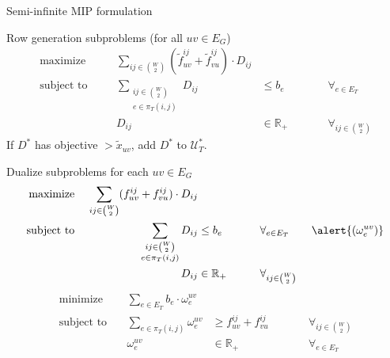 \documentclass[aspectratio=149]{beamer}
\begin{document}
\begin{frame}{Semi-infinite MIP formulation}
{\begin{textblock}{1}
\begin{alertblock}{Row generation subproblems (for all $uv \in E_G$)}
                    \vspace*{-1em}
                    \begin{alignat*}{5}
                        \text{maximize}\quad && \sum_{ij \in \binom{W}{2}} (\tilde f_{uv}^{ij} + \tilde f_{vu}^{ij}) \cdot D_{ij} &&& \\
                        \text{subject to}\quad && \sum_{\substack{ij \in \binom{W}{2}\\e \in \pi_T(i,j)}} D_{ij} &\le b_e &&\qquad \forall_{e \in E_T} \\
                        && D_{ij} &\in \mathbb{R}_+ &&\qquad \forall_{ij \in \binom{W}{2}}
                    \end{alignat*}
                    If $D^*$ has objective $> \tilde x_{uv}$, add $D^*$ to $\mathcal U_T^*$.
                \end{alertblock}
            \end{textblock}%
        }%
    \end{frame}

    \begin{frame}{Dualize subproblems for each $uv \in E_G$}
        \vspace*{-1em}
        \begin{alignat*}{5}
            \text{maximize}\ && \sum_{ij \in \binom{W}{2}} (f_{uv}^{ij} + f_{vu}^{ij}) \cdot D_{ij} &&& \\
            \text{subject to}\ && \sum_{\substack{ij \in \binom{W}{2}\\e \in \pi_T(i,j)}} D_{ij} &\le b_e &&\qquad \forall_{e \in E_T} \qquad \alert{(\omega_e^{uv})} \\
            && D_{ij} &\in \mathbb{R}_+ &&\qquad \forall_{ij \in \binom{W}{2}}
        \end{alignat*}
        \hrulefill
        \begin{alignat*}{5}
            \text{minimize}\ && \sum_{e \in E_T} b_e \cdot \omega_e^{uv} &&& \\
            \text{subject to}\ && \sum_{e \in \pi_T(i,j)} \omega_e^{uv} &\ge f_{uv}^{ij} + f_{vu}^{ij} &&\qquad \forall_{ij \in \binom{W}{2}} \\
            && \omega_e^{uv} &\in \mathbb{R}_+ &&\qquad \forall_{e \in E_T}
        \end{alignat*}
    \end{frame}
\end{document}
